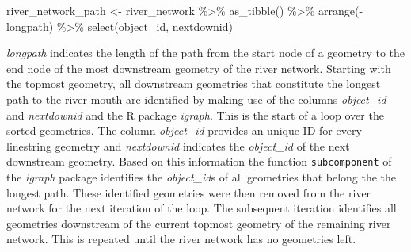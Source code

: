 \documentclass[fleqn,10pt]{wlscirep}
\newenvironment{Shaded}{\begin{snugshade}}{\end{snugshade}}
\newcommand{\FunctionTok}[1]{\textcolor[rgb]{0.00,0.00,0.00}{#1}}
\newcommand{\NormalTok}[1]{#1}
\newcommand{\OtherTok}[1]{\textcolor[rgb]{0.56,0.35,0.01}{#1}}
\newcommand{\SpecialCharTok}[1]{\textcolor[rgb]{0.00,0.00,0.00}{#1}}
\begin{document}
\footnotesize

\begin{Shaded}
\begin{Highlighting}[]
\NormalTok{river\_network\_path }\OtherTok{\textless{}{-}} 
\NormalTok{  river\_network }\SpecialCharTok{\%\textgreater{}\%} 
  \FunctionTok{as\_tibble}\NormalTok{() }\SpecialCharTok{\%\textgreater{}\%} 
  \FunctionTok{arrange}\NormalTok{(}\SpecialCharTok{{-}}\NormalTok{longpath) }\SpecialCharTok{\%\textgreater{}\%} 
  \FunctionTok{select}\NormalTok{(object\_id, nextdownid)}
\end{Highlighting}
\end{Shaded}

\normalsize

\emph{longpath} indicates the length of the path from the start node of a geometry to the end node of the most downstream geometry of the river network. Starting with the topmost geometry, all downstream geometries that constitute the longest path to the river mouth are identified by making use of the columns \emph{object\_id} and \emph{nextdownid} and the R package \emph{igraph}. This is the start of a loop over the sorted geometries. The column \emph{object\_id} provides an unique ID for every linestring geometry and \emph{nextdownid} indicates the \emph{object\_id} of the next downstream geometry. Based on this information the function \texttt{subcomponent} of the \emph{igraph} package identifies the \emph{object\_id}s of all geometries that belong the the longest path. These identified geometries were then removed from the river network for the next iteration of the loop. The subsequent iteration identifies all geometries downstream of the current topmost geometry of the remaining river network. This is repeated until the river network has no geometries left.

\footnotesize
\end{document}
